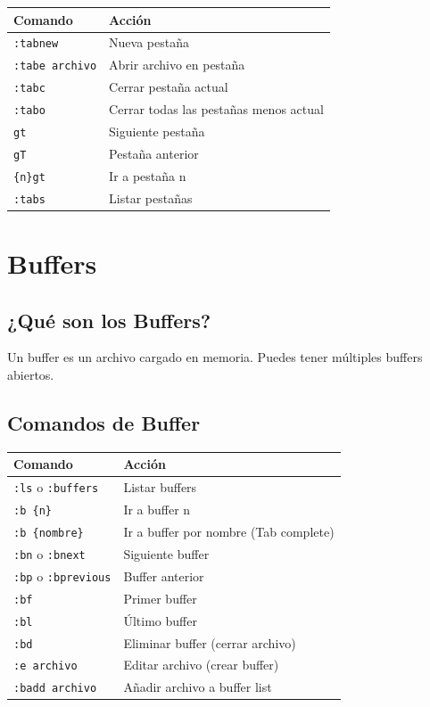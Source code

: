 \documentclass[
  doc,
  floatsintext,
  longtable,
  a4paper,
  nolmodern,
  notxfonts,
  notimes,
  12pt,
  colorlinks=true,linkcolor=blue,citecolor=blue,urlcolor=blue]{apa7}
\newcounter{none} %
\begin{document}
{\def\LTcaptype{none} %
\begin{longtable}[]{@{}ll@{}}
\toprule\noalign{}
Comando & Acción \\
\midrule\noalign{}
\endhead
\bottomrule\noalign{}
\endlastfoot
\texttt{:tabnew} & Nueva pestaña \\
\texttt{:tabe\ archivo} & Abrir archivo en pestaña \\
\texttt{:tabc} & Cerrar pestaña actual \\
\texttt{:tabo} & Cerrar todas las pestañas menos actual \\
\texttt{gt} & Siguiente pestaña \\
\texttt{gT} & Pestaña anterior \\
\texttt{\{n\}gt} & Ir a pestaña n \\
\texttt{:tabs} & Listar pestañas \\
\end{longtable}
}

\section{Buffers}\label{buffers}

\subsection{¿Qué son los Buffers?}\label{quuxe9-son-los-buffers}

Un buffer es un archivo cargado en memoria. Puedes tener múltiples
buffers abiertos.

\subsection{Comandos de Buffer}\label{comandos-de-buffer}

{\def\LTcaptype{none} %
\begin{longtable}[]{@{}ll@{}}
\toprule\noalign{}
Comando & Acción \\
\midrule\noalign{}
\endhead
\bottomrule\noalign{}
\endlastfoot
\texttt{:ls} o \texttt{:buffers} & Listar buffers \\
\texttt{:b\ \{n\}} & Ir a buffer n \\
\texttt{:b\ \{nombre\}} & Ir a buffer por nombre (Tab complete) \\
\texttt{:bn} o \texttt{:bnext} & Siguiente buffer \\
\texttt{:bp} o \texttt{:bprevious} & Buffer anterior \\
\texttt{:bf} & Primer buffer \\
\texttt{:bl} & Último buffer \\
\texttt{:bd} & Eliminar buffer (cerrar archivo) \\
\texttt{:e\ archivo} & Editar archivo (crear buffer) \\
\texttt{:badd\ archivo} & Añadir archivo a buffer list \\
\end{longtable}
}
\end{document}
